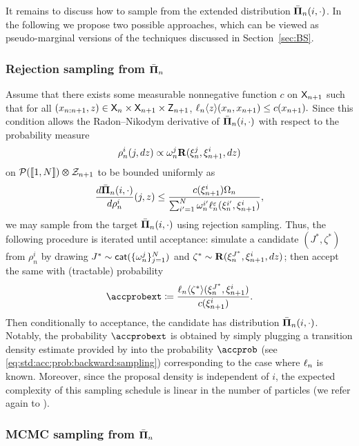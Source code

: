 It remains to discuss how to sample from the extended distribution $\bar{\boldsymbol{\Pi}}_{n}(i, \cdot)$. 
In the following we propose two possible approaches, which can be viewed as pseudo-marginal versions of the techniques discussed in Section~\ref{sec:BS}.  

\subsubsection*{Rejection sampling from $\bar{\boldsymbol{\Pi}}_{n}$} 

Assume that there exists some measurable nonnegative function $c$ on $\mathsf{X}_{n + 1}$ such that for all $(x_{n:n + 1}, z) \in \mathsf{X}_n \times \mathsf{X}_{n + 1} \times \mathsf{Z}_{n + 1}$,
$
\ell_{n} \langle z \rangle(x_n, x_{n + 1}) \leq c(x_{n + 1}).  
$
Since this condition allows the Radon--Nikodym derivative of $\bar{\boldsymbol{\Pi}}_{n}(i, \cdot)$ with respect to the probability measure 
\begin{equation} \label{eq:proposal:pm:rejection}
\rho_n^i(j, \rmd z) \propto \ewght{n}{j} \kernel{R}(\epart{n}{j}, \epart{n + 1}{i}, \rmd z)
\end{equation} 
on $\mathcal{P}(\llbracket 1, N \rrbracket) \varotimes \mathcal{Z}_{n + 1}$ to be bounded uniformly as 
$$
\frac{\rmd \trmext{n}(i, \cdot)}{\rmd \rho_n^i}(j, z) \leq \frac{c(\epart{n + 1}{i}) \sumwght{n}}{\sum_{i' = 1}^\N \ewght{n}{i'} \udmod{n}(\epart{n}{i'}, \epart{n + 1}{i})},  
$$ 
we may sample from the target $\bar{\boldsymbol{\Pi}}_{n}(i, \cdot)$ using rejection sampling. Thus, the following procedure is iterated until acceptance: simulate a candidate $(J^\ast, \zeta^\ast)$ from $\rho_n^i$ by drawing $J^\ast \sim \mathsf{cat}(\{ \omega_{n}^{j} \}_{j = 1}^N)$ and $\zeta^\ast \sim \mathbf{R}(\xi_{n}^{J^\ast}, \xi_{n + 1}^{i}, d z)$; then accept the same with (tractable) probability 
$$
\accprobext \eqdef \frac{\ukest{n}{\zeta^\ast}(\epart{n}{J^\ast}, \epart{n + 1}{i})}{c(\epart{n + 1}{i})}. 
$$ 
Then conditionally to acceptance, the candidate has distribution $\bar{\boldsymbol{\Pi}}_{n}(i, \cdot)$.  
Notably, the probability $\accprobext$ is obtained by simply plugging a transition density estimate provided by  into the probability $\accprob$ (see \eqref{eq:std:acc:prob:backward:sampling}) corresponding to the case where $\ell_{n}$ is known. Moreover, since the proposal density is independent of $i$, the expected complexity of this sampling schedule is linear in the number of particles (we refer again to \cite{douc:garivier:moulines:olsson:2010}).  

\subsubsection*{MCMC sampling from $\bar{\boldsymbol{\Pi}}_{n}$}

